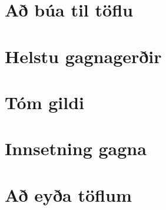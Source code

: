\section{Að búa til töflu} %
\section{Helstu gagnagerðir} %
\section{Tóm gildi} %
\section{Innsetning gagna} %
\section{Að eyða töflum} %